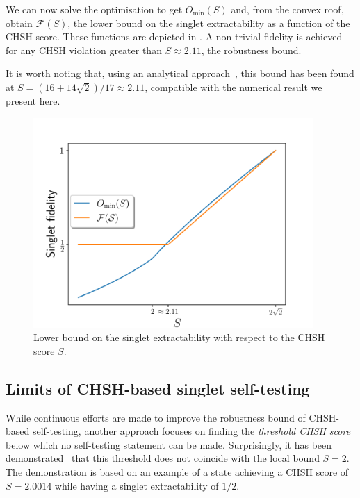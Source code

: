 We can now solve the optimisation  to get $O_{\min}(S)$ and, from the convex roof, obtain $\mathcal{F}(S)$, the lower bound on the singlet extractability as a function of the CHSH score.
These functions are depicted in .
A non-trivial fidelity is achieved for any CHSH violation greater than $S \approx 2.11$, the robustness bound. 

It is worth noting that, using an analytical approach~\cite{Kaniewski2016}, this bound has been found at $S=(16+14\sqrt{2})/17\approx2.11$, compatible with the numerical result we present here.

\begin{figure}
	\begin{center}
		\includegraphics[width=0.95\textwidth]{chapters/selftesting/img/fidCHSH.pdf}
	\end{center}
	\caption{Lower bound on the singlet extractability with respect to the CHSH score $S$.}
	\label{fig:fidCHSH}
\end{figure}

\subsection{Limits of CHSH-based singlet self-testing}

While continuous efforts are made to improve the robustness bound of CHSH-based self-testing, another approach focuses on finding the \textit{threshold CHSH score} below which no self-testing statement can be made.
Surprisingly, it has been demonstrated~\cite{Coopmans19} that this threshold does not coincide with the local bound $S=2$.
The demonstration is based on an example of a state achieving a CHSH score of $S=2.0014$ while having a singlet extractability of $1/2$.

